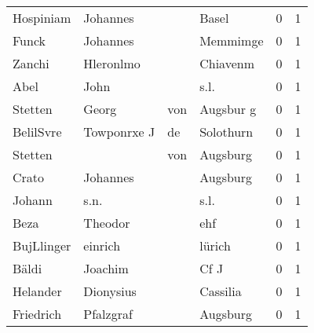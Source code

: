 \begin{center}
\begin{tiny}
\begin{longtabu}{llllrr}
                Hospiniam &                           Johannes &             &                                       Basel &          0 &         1 \\
                    Funck &                           Johannes &             &                                    Memmimge &          0 &         1 \\
                   Zanchi &                          Hleronlmo &             &                                    Chiavenm &          0 &         1 \\
                     Abel &                               John &             &                                        s.l. &          0 &         1 \\
                  Stetten &                              Georg &         von &                                   Augsbur g &          0 &         1 \\
                BelilSvre &                        Towponrxe J &          de &                                   Solothurn &          0 &         1 \\
                  Stetten &                                    &         von &                                    Augsburg &          0 &         1 \\
                    Crato &                           Johannes &             &                                    Augsburg &          0 &         1 \\
                   Johann &                               s.n. &             &                                        s.l. &          0 &         1 \\
                     Beza &                            Theodor &             &                                         ehf &          0 &         1 \\
               BujLlinger &                            einrich &             &                                      lürich &          0 &         1 \\
                    Bäldi &                            Joachim &             &                                        Cf J &          0 &         1 \\
                 Helander &                          Dionysius &             &                                    Cassilia &          0 &         1 \\
                Friedrich &                          Pfalzgraf &             &                                    Augsburg &          0 &         1 \\

\end{longtabu}
\end{tiny}
\end{center}
